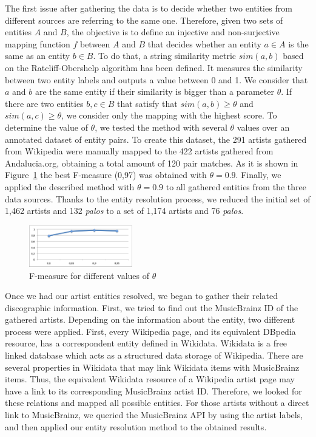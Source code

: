 The first issue after gathering the data is to decide whether two entities from different sources are referring to the same one. Therefore, given two sets of entities $A$ and $B$, the objective is to define an injective and non-surjective mapping function $f$ between $A$ and $B$ that decides whether an entity $a \in A$ is the same as an entity $b \in B$. To do that, a string similarity metric $sim(a,b)$ based on the Ratcliff-Obershelp algorithm \cite{Ratcliff1988} has been defined. It measures the similarity between two entity labels and outputs a value between 0 and 1. We consider that $a$ and $b$ are the same entity if their similarity is bigger than a parameter $\theta$. If there are two entities $b, c \in B$ that satisfy that $sim(a,b) \geq \theta$ and $sim(a,c) \geq \theta$, we consider only the mapping with the highest score. To determine the value of $\theta$, we tested the method with several $\theta$ values over an annotated dataset of entity pairs. To create this dataset, the 291 artists gathered from Wikipedia were manually mapped to the 422 artists gathered from Andalucia.org, obtaining a total amount of 120 pair matches. As it is shown in Figure~\ref{fig:fmeasure} the best F-measure (0,97) was obtained with $\theta=0.9$. Finally, we applied the described method with $\theta=0.9$ to all gathered entities from the three data sources. Thanks to the entity resolution process, we reduced the initial set of 1,462 artists and 132 \textit{palos} to a set of 1,174 artists and 76 \textit{palos}.

\begin{figure}
	\centering
	\includegraphics[width=0.40\textwidth]{ch08_musicology/pics/similarity_f.png}
	\caption{F-measure for different values of $\theta$ \label{fig:fmeasure}}
\end{figure}

Once we had our artist entities resolved, we began to gather their related discographic information. First, we tried to find out the MusicBrainz ID of the gathered artists. Depending on the information about the entity, two different process were applied. First, every Wikipedia page, and its equivalent DBpedia resource, has a correspondent entity defined in Wikidata. Wikidata is a free linked database which acts as a structured data storage of Wikipedia. There are several properties in Wikidata that may link Wikidata items with MusicBrainz items. Thus, the equivalent Wikidata resource of a Wikipedia artist page may have a link to its corresponding MusicBrainz artist ID. Therefore, we looked for these relations and mapped all possible entities. For those artists without a direct link to MusicBrainz, we queried the MusicBrainz API by using the artist labels, and then applied our entity resolution method to the obtained results.


